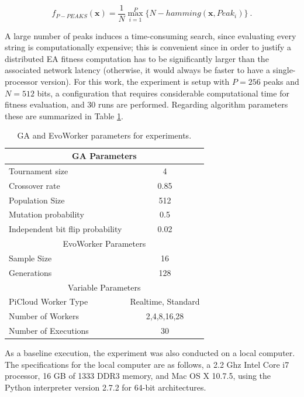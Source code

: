 \begin{equation}
f_{P-PEAKS}(\mathbf{x})=\frac{1}{N} \overset{P}{\max_{i=1}} \{N-hamming(\mathbf{x},Peak_i)   \} \ .
\end{equation}

A large number of peaks induces a time-consuming search,
since evaluating every string is computationally expensive; this is
convenient since in order to justify a distributed EA fitness computation has to be significantly larger than the associated
network latency (otherwise, it would always be faster to have a single-processor version).
For this work, the experiment is setup with $P = 256$ peaks and $N = 512$ bits, a configuration that requires considerable computational time for
fitness evaluation, and 30 runs are performed.
Regarding algorithm parameters these are summarized in Table \ref{tab:paramse}.

\begin{table}[t]
\renewcommand{\arraystretch}{1.3}
\caption{GA and EvoWorker parameters for experiments.}
\label{tab:paramse}
\centering
\begin{tabular}{|l||c|}
\hline
\multicolumn{2}{|c|}{GA Parameters} \\
\hline
Tournament size & 4 \\
Crossover rate & 0.85  \\
Population Size & 512 \\
Mutation probability & 0.5 \\
Independent bit flip probability  & 0.02 \\
\hline
\multicolumn{2}{|c|}{EvoWorker Parameters} \\
\hline
Sample Size & 16 \\
Generations & 128 \\
\hline
\multicolumn{2}{|c|}{Variable Parameters} \\
\hline
PiCloud Worker Type & Realtime, Standard \\
Number of Workers & 2,4,8,16,28 \\
Number of Executions & 30 \\
\hline

\end{tabular}
\end{table}

As a baseline execution, the experiment was also conducted on a local computer. The specifications for the local computer are as follows, a
2.2 Ghz Intel Core i7 processor, 16 GB of 1333 DDR3 memory, and Mac OS X 10.7.5,
using the Python interpreter version 2.7.2 for 64-bit architectures. 

